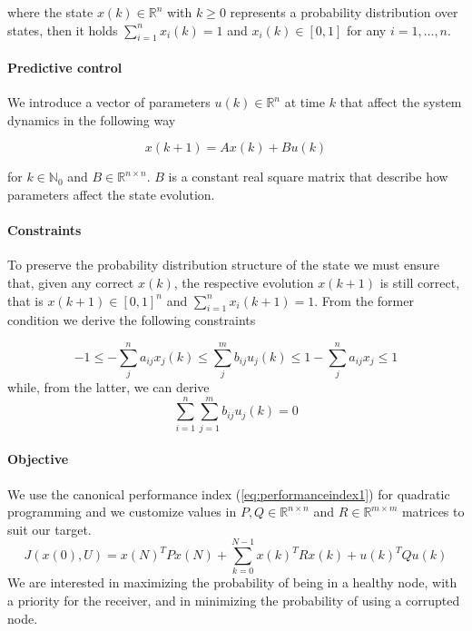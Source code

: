 \documentclass[a4paper, 11pt]{article}
\theoremstyle{definition}
\theoremstyle{remark}
\begin{document}
where the state $x(k) \in \mathbb{R}^n$ with $k \geq 0$ represents a probability distribution over states, then it holds $\sum_{i=1}^n x_i(k) = 1$ and $x_i(k) \in [0,1]$ for any $i = 1,\dots,n$.

\paragraph{Predictive control} %
\label{par:predictive_control}
We introduce a vector of parameters $u(k) \in \mathbb{R}^n$ at time $k$ that affect the system dynamics in the following way

\begin{equation} \label{eq:mpc}
		x(k+1) = Ax(k) + Bu(k)
\end{equation}

for $k \in \mathbb{N}_0$ and $B \in \mathbb{R}^{n\times n}$. $B$ is a constant real square matrix that describe how parameters affect the state evolution.


\paragraph{Constraints} %
\label{par:constraints}
To preserve the probability distribution structure of the state we must ensure that, given any correct $x(k)$, the respective evolution $x(k+1)$ is still correct, that is $x(k+1) \in [0,1]^n$ and $\sum_{i=1}^n x_i(k+1) = 1$. From the former condition we derive the following constraints

\begin{equation} \label{eq:constr1}
	-1 \leq -\sum_j^n a_{ij} x_j(k) \leq \sum_j^m b_{ij} u_j(k) \leq 1 - \sum_j^n a_{ij} x_j \leq 1
\end{equation}
while, from the latter, we can derive
\begin{equation} \label{eq:constr2}
	\sum_{i=1}^n\sum_{j=1}^m b_{ij} u_j(k) = 0
\end{equation}



\paragraph{Objective} %
\label{par:objective1}
We use the canonical performance index (\ref{eq:performanceindex1}) for quadratic programming and we customize values in $P,Q \in \mathbb{R}^{n\times n}$ and $R \in \mathbb{R}^{m\times m}$ matrices to suit our target.
\begin{equation} \label{eq:performanceindex1}
	J(x(0),U) = x(N)^T P x(N) + \sum_{k=0}^{N-1} x(k)^T R x(k) + u(k)^T Q u(k)
\end{equation}
We are interested in maximizing the probability of being in a healthy node, with a priority for the receiver, and in minimizing the probability of using a corrupted node. 
\end{document}
